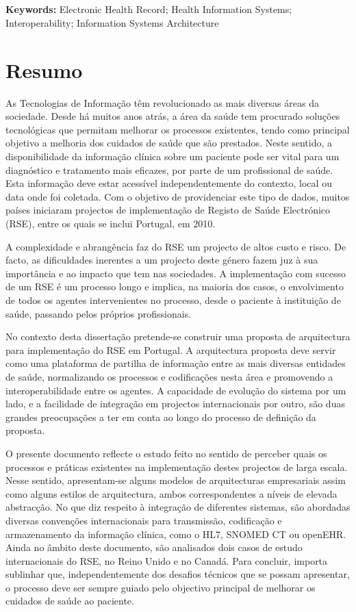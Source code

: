 \section*{}
\textbf{Keywords:} Electronic Health Record; Health Information Systems; Interoperability; Information Systems Architecture

\chapter*{Resumo}

As Tecnologias de Informação têm revolucionado as mais diversas áreas da sociedade. Desde há muitos anos atrás, a área da saúde tem procurado soluções tecnológicas que permitam melhorar os processos existentes, tendo como principal objetivo a melhoria dos cuidados de saúde que são prestados. Neste sentido, a disponibilidade da informação clínica sobre um paciente pode ser vital para um diagnóstico e tratamento mais eficazes, por parte de um profissional de saúde. Esta informação deve estar acessível independentemente do contexto, local ou data onde foi coletada. Com o objetivo de providenciar este tipo de dados, muitos países iniciaram projectos de implementação de Registo de Saúde Electrónico (RSE), entre os quais se inclui Portugal, em 2010. 

A complexidade e abrangência faz do RSE um projecto de altos custo e risco. De facto, as dificuldades inerentes a um projecto deste género fazem juz à sua importância e ao impacto que tem nas sociedades. A implementação com sucesso de um RSE é um processo longo e implica, na maioria dos casos, o envolvimento de todos os agentes intervenientes no processo, desde o paciente à instituição de saúde, passando pelos próprios profissionais.

No contexto desta dissertação pretende-se construir uma proposta de arquitectura para implementação do RSE em Portugal. A arquitectura proposta deve servir como uma plataforma de partilha de informação entre as mais diversas entidades de saúde, nor\-ma\-li\-zan\-do os processos e codificações nesta área e promovendo a interoperabilidade entre os agentes. A capacidade de evolução do sistema por um lado, e a facilidade de integração em projectos internacionais por outro, são duas grandes preocupações a ter em conta ao longo do processo de definição da proposta.

O presente documento reflecte o estudo feito no sentido de perceber quais os processos e práticas existentes na implementação destes projectos de larga escala. Nesse sentido, apresentam-se alguns modelos de arquitecturas empresariais assim como alguns estilos de arquitectura, ambos correspondentes a níveis de elevada abstracção. No que diz respeito à integração de diferentes sistemas, são abordadas diversas convenções internacionais para transmissão, codificação e armazenamento da informação clínica, como o HL7, SNOMED CT ou openEHR. Ainda no âmbito deste documento, são analisados dois casos de estudo internacionais do RSE, no Reino Unido e no Canadá. Para concluir, importa sublinhar que, independentemente dos desafios técnicos que se possam apresentar, o processo deve ser sempre guiado pelo objectivo principal de melhorar os cuidados de saúde ao paciente.

